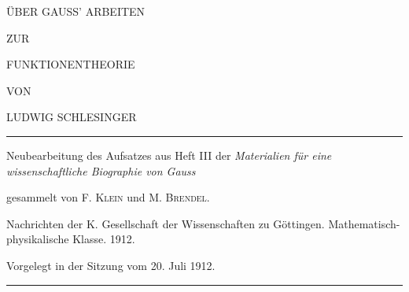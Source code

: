 \clearpage\NoSourceHead{}
\begin{center}
\vspace*{2em}
{\Large ÜBER GAUSS’ ARBEITEN\par}
\vspace{1em}
ZUR\par
\vspace{1em}
{\Large FUNKTIONENTHEORIE\par}
\vspace{3em}
VON\par
\vspace{2em}
{\Large LUDWIG SCHLESINGER\par}
\end{center}
\vfill
\hrule\smallskip
\begin{center}\small
Neubearbeitung des Aufsatzes aus Heft III der \textit{Materialien für eine wissenschaftliche Biographie von Gauss}\par
gesammelt von F. \textsc{Klein} und M. \textsc{Brendel}.\par
Nachrichten der K. Gesellschaft der Wissenschaften zu Göttingen. Mathematisch-physikalische Klasse. 1912.\par
Vorgelegt in der Sitzung vom 20. Juli 1912.
\end{center}
\smallskip\hrule
\vspace{2em}
\clearpage
